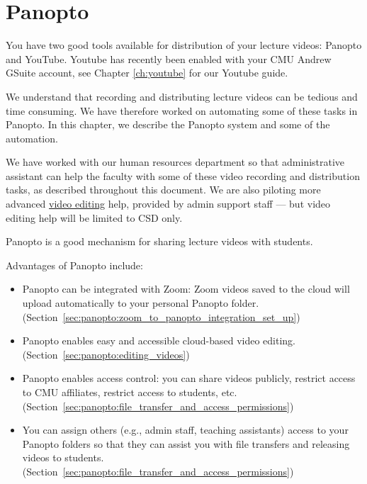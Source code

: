 \chapter{Panopto}
\label{ch:panopto}

\begin{preamble}
You have two good tools available for distribution of your lecture
videos: Panopto and YouTube.  Youtube has recently been enabled with your CMU Andrew GSuite account, see Chapter \ref{ch:youtube} for our Youtube guide.
%

We understand that recording and distributing lecture videos can be tedious and time consuming.
%
We have therefore worked on automating some of these tasks in Panopto.  In this
chapter, we describe the Panopto system and some of the automation.
%

%
We have worked with our human resources department so that
administrative assistant can help the faculty with some of these video
recording and distribution tasks, as described throughout this document.
%
We are also piloting more advanced \href{sec:panopto:editing_videos}{video editing} help, provided by admin support staff — but video editing help will be limited to CSD only.
\end{preamble}

\begin{gram}[Introduction]
\label{grm:panopto:introduction}


Panopto is a good mechanism for sharing lecture videos with students.


Advantages of Panopto include:
	\begin{itemize}
		\item Panopto can be integrated with Zoom: Zoom videos saved to the cloud will upload automatically to your personal Panopto folder. (Section~\ref{sec:panopto:zoom_to_panopto_integration_set_up})
		\item Panopto enables easy and accessible cloud-based video editing. (Section~\ref{sec:panopto:editing_videos})
		\item Panopto enables access control: you can share videos publicly, restrict access to CMU affiliates, restrict access to students, etc. (Section~\ref{sec:panopto:file_transfer_and_access_permissions})
		\item You can assign others (e.g., admin staff, teaching assistants) access to your Panopto folders so that they can assist you with file transfers and releasing videos to students. (Section~\ref{sec:panopto:file_transfer_and_access_permissions})
	\end{itemize}
\end{gram}


